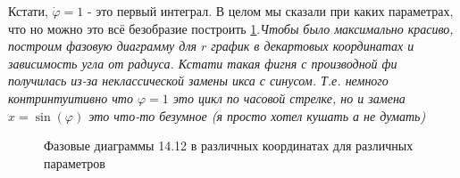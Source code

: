 \documentclass{article}
\begin{document}
 Кстати, $\dot{\varphi}=1$ - это первый интеграл. В целом мы сказали при каких параметрах, что но можно это всё безобразие построить \ref{fig:14.12}.\textcolor[rgb]{0.480469,0.566406,0.480469}{\textit{Чтобы было максимально красиво, построим фазовую диаграмму для $r$ график в декартовых координатах и зависимость угла от радиуса. Кстати такая фигня с производной фи получилась из-за неклассической замены икса с синусом. Т.е. немного контринтуитивно что $\varphi =1$ это цикл по часовой стрелке, но и замена $x=\sin{(\varphi)}$ это что-то безумное (я просто хотел кушать а не думать)}}
\begin{figure}[h!]
\caption{Фазовые диаграммы 14.12 в различных координатах для различных параметров}
\label{fig:14.12}
\end{figure}                                                                 
\end{document}
